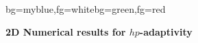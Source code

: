 {

\begin{frame}[plain]
\begin{variableblock}{}{bg=myblue,fg=white}{bg=green,fg=red}
\begin{center}
\textbf{2D Numerical results for $hp$-adaptivity}
\end{center}
\end{variableblock}
\end{frame}
}
